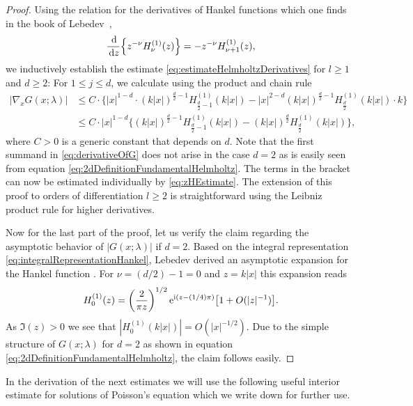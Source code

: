 \begin{proof}
  Using the relation for the derivatives of Hankel functions which one finds in the book of Lebedev~\cite[Eq. (5.6.3)]{lebedev},
  \begin{align*}
    \frac{\, {\operatorname{d}\!{}}}{\, {\operatorname{d}\!{z}}} \Big\{ z^{-\nu} H_\nu^{(1)}(z) \Big\} = -z^{-\nu} H_{\nu + 1}^{(1)} (z),
  \end{align*}
  we inductively establish the estimate \eqref{eq:estimateHelmholtzDerivatives} for $l \geq 1$ and $d \geq 2$:
  For $1 \leq j \leq d$, we calculate using the product and chain rule 
  \begin{align}
    \label{eq:derivativeOfG}
    |\nabla_x^{} G(x; \lambda)|
    &\leq C  \cdot \Big\{|x|^{1 - d} \cdot (k|x|)^{\frac{d}{2} - 1} H_{\frac{d}{2} - 1}^{(1)}(k|x|) - |x|^{2 - d} (k|x|)^{\frac{d}{2} - 1} H_{\frac{d}{2}}^{(1)}(k|x|) \cdot k\Big\} \nonumber\\
    &\leq C \cdot |x|^{1 - d}\Big\{(k|x|)^{\frac{d}{2} - 1} H_{\frac{d}{2} - 1}^{(1)}(k|x|) -  (k|x|)^{\frac{d}{2}} H_{\frac{d}{2}}^{(1)}(k|x|) \Big\},
  \end{align}
  where $C > 0$ is a generic constant that depends on $d$. 
  Note that the first summand in \eqref{eq:derivativeOfG} does not arise in the case $d = 2$ as is easily seen from equation \eqref{eq:2dDefinitionFundamentalHelmholtz}.
  The terms in the bracket can now be estimated individually by \eqref{eq:zHEstimate}.
  The extension of this proof to orders of differentiation $l \geq 2$ is straightforward using the Leibniz product rule for higher derivatives.

  Now for the last part of the proof, let us verify the claim regarding the asymptotic behavior of $|G(x; \lambda)|$ if $d = 2$.
  Based on the integral representation \eqref{eq:integralRepresentationHankel}, Lebedev derived an asymptotic expansion for the Hankel function \cite[Sec. 5.11, Eq.  (5.11.3)]{lebedev}. 
  For $\nu = (d/2) - 1 = 0$ and $z = k|x|$ this expansion reads
  \begin{align*}
    H_0^{(1)}(z) = \left(\frac{2}{\pi z}\right)^{1/2} \mathrm{e}^{\mathrm{i} (z - (1/4) \pi)} \big[ 1 + O(|z|^{-1})\big].
  \end{align*}
  As $\Im(z) > 0$ we see that $|H_0^{(1)}(k |x|)| = O(|x|^{-1/2})$.
  Due to the simple structure of $G(x; \lambda)$ for $d = 2$ as shown in equation \eqref{eq:2dDefinitionFundamentalHelmholtz}, the claim follows easily.
\end{proof}

In the derivation of the next estimates we will use the following useful interior estimate for solutions of Poisson's equation which we write down for further use.

